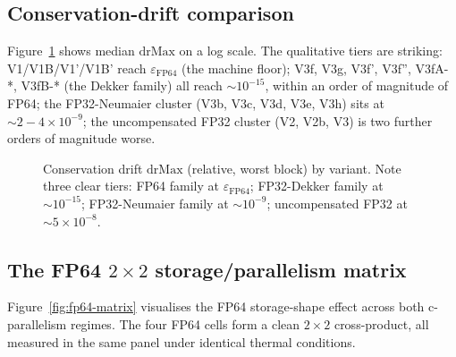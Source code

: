 \documentclass[11pt,a4paper]{article}
\begin{document}
\subsection{Conservation-drift comparison}

Figure~\ref{fig:drift} shows median \(\mathrm{drMax}\) on a log
scale. The qualitative tiers are striking: V1/V1B/V1'/V1B' reach
\(\varepsilon_{\mathrm{FP64}}\) (the machine floor); V3f, V3g, V3f',
V3f'', V3fA-*, V3fB-* (the Dekker family) all reach \(\sim
10^{-15}\), within an order of magnitude of FP64; the FP32-Neumaier
cluster (V3b, V3c, V3d, V3e, V3h) sits at \(\sim 2\!-\!4\times
10^{-9}\); the uncompensated FP32 cluster (V2, V2b, V3) is two
further orders of magnitude worse.

\begin{figure}[!htb]
\centering
{}
\caption{Conservation drift \(\mathrm{drMax}\) (relative, worst
block) by variant. Note three clear tiers: FP64 family at
\(\varepsilon_{\mathrm{FP64}}\); FP32-Dekker family at \(\sim
10^{-15}\); FP32-Neumaier family at \(\sim 10^{-9}\); uncompensated
FP32 at \(\sim 5\times 10^{-8}\).}
\label{fig:drift}
\end{figure}

\subsection{The FP64 \(2\times 2\) storage/parallelism matrix}

Figure~\ref{fig:fp64-matrix} visualises the FP64 storage-shape effect
across both c-parallelism regimes. The four FP64 cells form a clean
\(2\times 2\) cross-product, all measured in the same panel under
identical thermal conditions.
\end{document}
